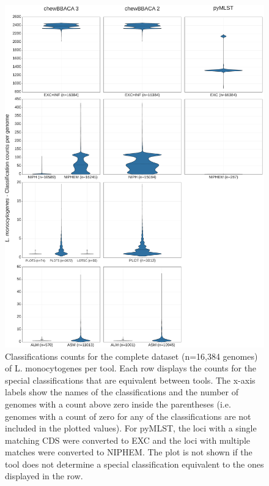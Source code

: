 \newpage
\begin{figure}[h!]
    \centering
    \includegraphics[angle=0,width=\textwidth]{figures/chapter 2/FigureS18.pdf}
    \caption{Classifications counts for the complete dataset (n=16,384 genomes) of L. monocytogenes per tool. Each row displays the counts for the special classifications that are equivalent between tools. The x-axis labels show the names of the classifications and the number of genomes with a count above zero inside the parentheses (i.e. genomes with a count of zero for any of the classifications are not included in the plotted values). For pyMLST, the loci with a single matching CDS were converted to EXC and the loci with multiple matches were converted to NIPHEM. The plot is not shown if the tool does not determine a special classification equivalent to the ones displayed in the row.}
    \label{fig:chap2_figureS18}
\end{figure}

